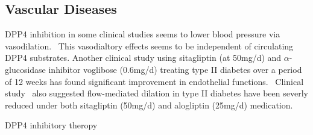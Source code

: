 \subsection{Vascular Diseases}
DPP4 inhibition in some clinical studies seems to lower blood pressure via vasodilation.~\cite{Kröller-Schön2012} This vasodialtory effects seems to be independent of circulating DPP4 substrates. Another clinical study using sitagliptin (at 50mg/d) and $\alpha$-glucosidase inhibitor voglibose (0.6mg/d) treating type II diabetes over a period of 12 weeks has found significant improvement in endothelial functions.~\cite{Nakamura2014} Clinical study~\cite{Ayaori2013} also suggested flow-mediated dilation in type II diabetes have been severly reduced under both sitagliptin (50mg/d) and alogliptin (25mg/d) medication.
\par 
DPP4 inhibitory theropy 
